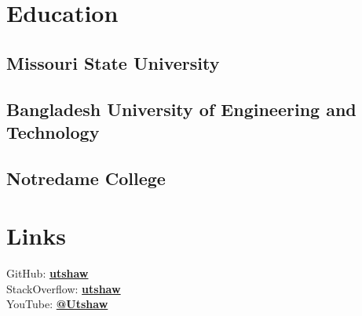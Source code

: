 \documentclass[letterpaper]{deedy-resume} %
\begin{document}
\begin{minipage}[t]{0.33\textwidth} %


\section{Education} 

\subsection{Missouri State University}


\sectionspace %

\subsection{Bangladesh University of Engineering and Technology}

\sectionspace %


\subsection{Notredame College}


\sectionspace %


\section{Links} 

GitHub: \href{https://github.com/Utshaw}{\bf utshaw} \\
StackOverflow: \href{https://stackoverflow.com/users/7004995/utshaw}{\bf utshaw} \\
YouTube: \href{https://www.youtube.com/@Utshaw}{\bf @Utshaw} \\


\end{minipage}
\end{document}
